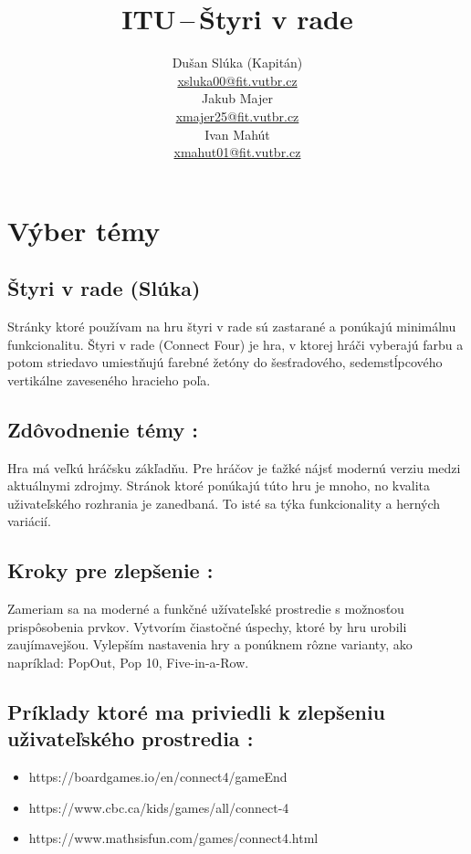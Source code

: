 \documentclass[a4paper, 11pt, onecolumn]{article}
\title{ITU\,--\,Štyri v rade}
\author{Dušan Slúka (Kapitán)\\ \href{mailto:xsluka00@fit.vutbr.cz}{xsluka00@fit.vutbr.cz}\\
        Jakub Majer \\ \href{mailto:xmajer25@vutbr.cz}{xmajer25@fit.vutbr.cz}\\
        Ivan Mahút \\ \href{mailto:xmahut01@vutbr.cz}{xmahut01@fit.vutbr.cz}}
\date{}
\begin{document}
\maketitle

\section{Výber témy}
\subsection{Štyri v rade (Slúka)}
Stránky ktoré používam na hru štyri v rade sú zastarané a ponúkajú minimálnu funkcionalitu.
Štyri v rade (Connect Four) je hra, v ktorej hráči vyberajú farbu a potom striedavo umiestňujú farebné 
žetóny do šesťradového, sedemstĺpcového vertikálne zaveseného hracieho poľa. 


\subsection*{Zdôvodnenie témy :} 
Hra má veľkú hráčsku zákľadňu. Pre hráčov je ťažké nájsť modernú verziu medzi aktuálnymi zdrojmy. Stránok ktoré
ponúkajú túto hru je mnoho, no kvalita uživateľského rozhrania je zanedbaná. To isté sa týka funkcionality a herných variácií.

\subsection*{Kroky pre zlepšenie :} 
Zameriam sa na moderné a funkčné užívateľské prostredie s možnosťou prispôsobenia prvkov. 
Vytvorím čiastočné úspechy, ktoré by hru urobili zaujímavejšou. 
Vylepším nastavenia hry a ponúknem rôzne varianty, ako napríklad: PopOut, Pop 10, Five-in-a-Row.
\subsection*{Príklady ktoré ma priviedli k zlepšeniu uživateľského prostredia :} 
\begin{itemize}
  \item https://boardgames.io/en/connect4/gameEnd
  \item https://www.cbc.ca/kids/games/all/connect-4
  \item https://www.mathsisfun.com/games/connect4.html
\end{itemize}
\end{document}
